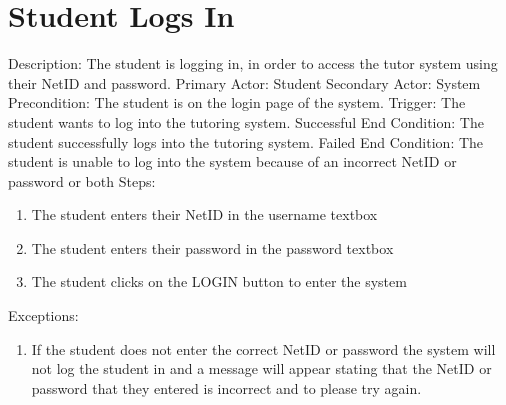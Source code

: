     \section{Student Logs In}
        Description: The student is logging in, in order to access the tutor system using their NetID and password. \newline
        Primary Actor: Student \newline
        Secondary Actor: System \newline
        Precondition: The student is on the login page of the system. \newline
        Trigger: The student wants to log into the tutoring system. \newline
        Successful End Condition: The student successfully logs into the tutoring system. \newline
        Failed End Condition:  The student is unable to log into the system because of an incorrect NetID or password or both \newline
        \newline
        Steps:
        \begin{enumerate}
            \item{The student enters their NetID in the username textbox}
            \item{The student enters their password in the password textbox}
            \item{The student clicks on the LOGIN button to enter the system}
        \end{enumerate}
        Exceptions:
        \begin{enumerate}
            \item{If the student does not enter the correct NetID or password the system will 
            not log the student in and a message will appear stating that the NetID or password 
            that they entered is incorrect and to please try again.}
        \end{enumerate}
        
